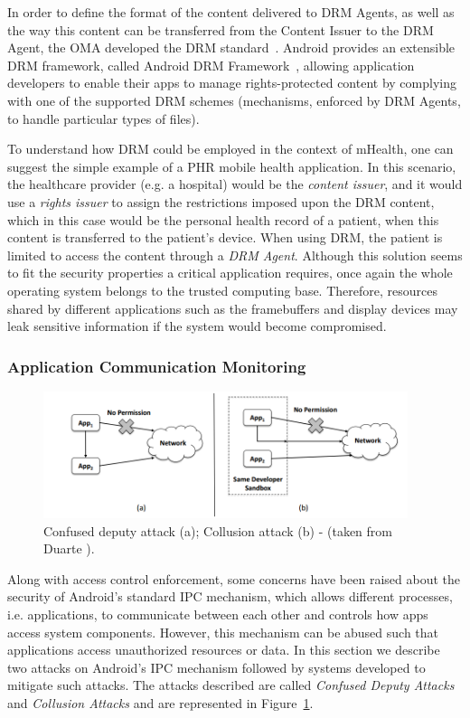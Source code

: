 In order to define the format of the content delivered to DRM Agents, as well as the way this content can be transferred from the Content Issuer to the DRM Agent, the \ac{OMA} developed the DRM standard~\cite{drm}. Android provides an extensible DRM framework, called Android DRM Framework~\cite{android_drm}, allowing application developers to enable their apps to manage rights-protected content by complying with one of the supported DRM schemes (mechanisms, enforced by DRM Agents, to handle particular types of files).

To understand how \ac{DRM} could be employed in the context of mHealth, one can suggest the simple example of a \ac{PHR} mobile health application. In this scenario, the healthcare provider (e.g. a hospital) would be the \emph{content issuer}, and it would use a \emph{rights issuer} to assign the restrictions imposed upon the \ac{DRM} content, which in this case would be the personal health record of a patient, when this content is transferred to the patient's device. When using \ac{DRM}, the patient is limited to access the content through a \emph{\ac{DRM} Agent}. Although this solution seems to fit the security properties a critical application requires, once again the whole operating system belongs to the trusted computing base. Therefore, resources shared by different applications such as the framebuffers and display devices may leak sensitive information if the system would become compromised.

\subsubsection{Application Communication Monitoring}

\begin{figure}[t!]
	\centering
	\includegraphics[width=0.95\textwidth]{img/communicationattacks.png}
	\caption{Confused deputy attack (a); Collusion attack (b) - (taken from Duarte \cite{nunoduarte}).}
	\label{fig:communicationattacks}
\end{figure}

Along with access control enforcement, some concerns have been raised about the security of Android's standard \ac{IPC} mechanism, which allows different processes, i.e. applications, to communicate between each other and controls how apps access system components. However, this mechanism can be abused such that applications access unauthorized resources or data. In this section we describe two attacks on Android's IPC mechanism followed by systems developed to mitigate such attacks. The attacks described are called \emph{Confused Deputy Attacks} and \emph{Collusion Attacks} and are represented in Figure~\ref{fig:communicationattacks}.

